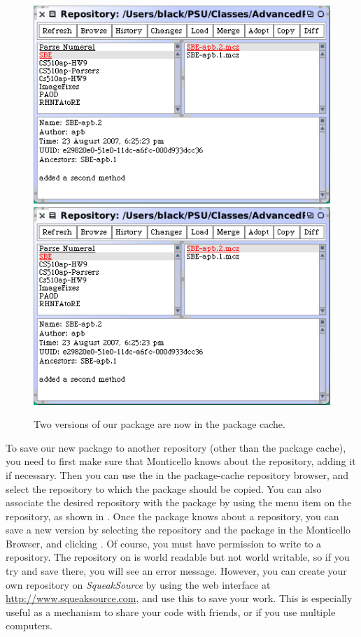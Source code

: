 \documentclass[a4paper,10pt,twoside]{book}
\begin{document}
\begin{figure}[tbp]
	\begin{center}
	\ifluluelse
		{\includegraphics[scale=0.65]{package-cache-browser}}
		{\includegraphics[scale=0.7]{package-cache-browser}}
	\end{center}
	\caption{Two versions of our package are now in the package cache.}
	\label{fig:package-cache-browser}
\end{figure}

To save our new package to another repository (other than the package cache), you need to first make sure that Monticello knows about the repository, adding it if necessary.  
Then you can use the  in the package-cache repository browser, and select the repository to which the package should be copied.  
You can also associate the desired repository with the package by using the  menu item  on the repository, as shown in .  
Once the package knows about a repository, you can save a new version by selecting the repository and the package in the Monticello Browser, and clicking .  
Of course, you must have permission to write to a repository.  
The  repository on  is world readable but not world writable, so if you try and save there, you will see an error message.  
However, you can create your own repository on \emph{SqueakSource} by using the web interface at \url{http://www.squeaksource.com}, and use this to save your work. 
This is especially useful as a mechanism to share your code with friends, or if you use multiple computers.
\end{document}
